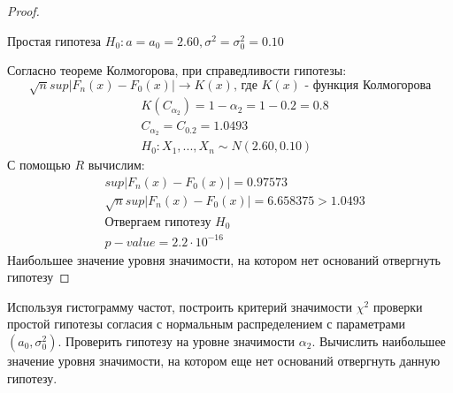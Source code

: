 \begin{proof}
	$ $
	
	Простая гипотеза $H_0: a=a_0=2.60, \sigma^2=\sigma_0^2=0.10$ 
	
	Согласно теореме Колмогорова, при справедливости гипотезы:
	\begin{equation}
		\sqrt{n}sup|F_n(x)-F_0(x)|\rightarrow K(x)\text{, где $K(x)$ - функция Колмогорова}
	\end{equation}
	\begin{align}
		& K(C_{\alpha_2})=1-\alpha_2=1-0.2=0.8 \\
		& C_{\alpha_2}=C_{0.2}=1.0493 \\
		& H_0: X_1, ..., X_n\sim N(2.60, 0.10) 
	\end{align}
	С помощью $R$ вычислим:
	\begin{align}
		& sup|F_n(x)-F_0(x)| = 0.97573 \\
		& \sqrt{n}sup|F_n(x)-F_0(x)| = 6.658375 > 1.0493 \\
		& \text{Отвергаем гипотезу } H_0 \\
		& p-value = 2.2 \cdot 10^{-16} 
	\end{align}
	Наибольшее значение уровня значимости, на котором нет оснований отвергнуть гипотезу
\end{proof}


\begin{problem}
	Используя гистограмму частот, построить критерий значимости $\chi^2$ проверки простой гипотезы согласия с нормальным распределением с параметрами $(a_0, \sigma_0^2)$. Проверить гипотезу на уровне значимости $\alpha_2$. Вычислить наибольшее значение уровня значимости, на котором еще нет оснований отвергнуть данную гипотезу. 
\end{problem}

